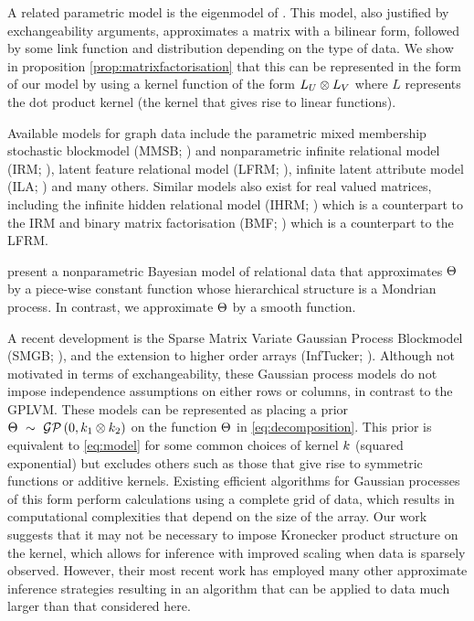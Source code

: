 A related parametric model is the eigenmodel of \citet{Hoff2007-ja}.
This model, also justified by exchangeability arguments, approximates a matrix with a bilinear form, followed by some link function and distribution depending on the type of data.
We show in proposition \ref{prop:matrixfactorisation} that this can be represented in the form of our model by using a kernel function of the form $L_U \otimes L_V$ where $L$ represents the dot product kernel (\ie the kernel that gives rise to linear functions).

Available models for graph data include the parametric mixed membership stochastic blockmodel (MMSB; \cite{Airoldi2008-fr}) and nonparametric infinite relational model (IRM; \cite{Kemp2006-jt}), latent feature relational model (LFRM; \cite{Miller2009-wg}), infinite latent attribute model (ILA; \cite{Palla2012-ch}) and many others.
Similar models also exist for real valued matrices, including the infinite hidden relational model (IHRM; \cite{Xu2006-uy}) which is a counterpart to the IRM and binary matrix factorisation (BMF; \cite{Meeds2007-gd}) which is a counterpart to the LFRM.

\citet{Roy2009-ge} present a nonparametric Bayesian model of relational data that approximates $\Theta$ by a piece-wise constant function whose hierarchical structure is a Mondrian process. In contrast, we approximate $\Theta$ by a smooth function.

A recent development is the Sparse Matrix Variate Gaussian Process Blockmodel (SMGB; \cite{Yan2011-lc}), and the extension to higher order arrays (InfTucker; \cite{Xu2012-ub}).
Although not motivated in terms of exchangeability, these Gaussian process models do not impose independence assumptions on either rows or columns, in contrast to the GPLVM.
These models can be represented as placing a prior ${\Theta \ \sim\  \mathcal{GP}\,(0, k_1 \otimes k_2)}$ on the function $\Theta$ in \eqref{eq:decomposition}.
This prior is equivalent to \eqref{eq:model} for some common choices of kernel $k$ (\eg squared exponential) but excludes others such as those that give rise to symmetric functions or additive kernels.
Existing efficient algorithms for Gaussian processes of this form \citep[e.g.][]{Saatci2011-yo} perform calculations using a complete grid of data, which results in computational complexities that depend on the size of the array.
Our work suggests that it may not be necessary to impose Kronecker product structure on the kernel, which allows for inference with improved scaling when data is sparsely observed.
However, their most recent work \citep{Zhe2013-tv} has employed many other approximate inference strategies resulting in an algorithm that can be applied to data much larger than that considered here.

